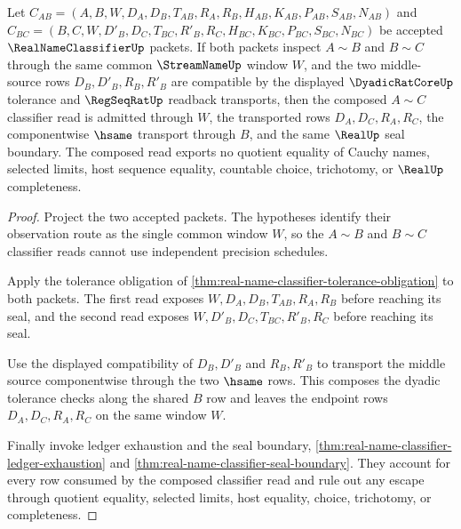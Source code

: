 \begin{theorem}
\label{thm:real-name-classifier-common-window-transitivity}
Let $C_{AB}=(A,B,W,D_A,D_B,T_{AB},R_A,R_B,H_{AB},K_{AB},P_{AB},S_{AB},N_{AB})$ and $C_{BC}=(B,C,W,D'_B,D_C,T_{BC},R'_B,R_C,H_{BC},K_{BC},P_{BC},S_{BC},N_{BC})$ be accepted $\RealNameClassifierUp$ packets. If both packets inspect $A\sim B$ and $B\sim C$ through the same common $\StreamNameUp$ window $W$, and the two middle-source rows $D_B,D'_B,R_B,R'_B$ are compatible by the displayed $\DyadicRatCoreUp$ tolerance and $\RegSeqRatUp$ readback transports, then the composed $A\sim C$ classifier read is admitted through $W$, the transported rows $D_A,D_C,R_A,R_C$, the componentwise $\hsame$ transport through $B$, and the same $\RealUp$ seal boundary. The composed read exports no quotient equality of Cauchy names, selected limits, host sequence equality, countable choice, trichotomy, or $\RealUp$ completeness.
\end{theorem}
\begin{proof}
Project the two accepted packets. The hypotheses identify their observation route as the single common window $W$, so the $A\sim B$ and $B\sim C$ classifier reads cannot use independent precision schedules.

Apply the tolerance obligation of \autoref{thm:real-name-classifier-tolerance-obligation} to both packets. The first read exposes $W,D_A,D_B,T_{AB},R_A,R_B$ before reaching its seal, and the second read exposes $W,D'_B,D_C,T_{BC},R'_B,R_C$ before reaching its seal.

Use the displayed compatibility of $D_B,D'_B$ and $R_B,R'_B$ to transport the middle source componentwise through the two $\hsame$ rows. This composes the dyadic tolerance checks along the shared $B$ row and leaves the endpoint rows $D_A,D_C,R_A,R_C$ on the same window $W$.

Finally invoke ledger exhaustion and the seal boundary, \autoref{thm:real-name-classifier-ledger-exhaustion} and \autoref{thm:real-name-classifier-seal-boundary}. They account for every row consumed by the composed classifier read and rule out any escape through quotient equality, selected limits, host equality, choice, trichotomy, or completeness.
\end{proof}

